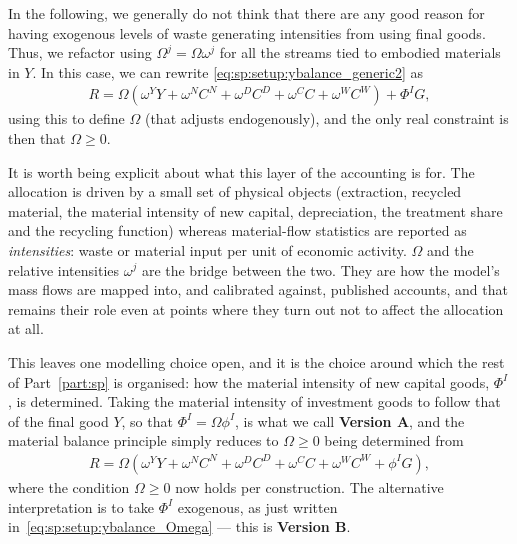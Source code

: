 In the following, we generally do not think that there are any good reason for having exogenous levels of waste generating intensities from using final goods. Thus, we refactor using $\Omega^j = \Omega \omega^j$ for all the streams tied to embodied materials in $Y$. In this case, we can rewrite \eqref{eq:sp:setup:ybalance_generic2} as
\begin{align}
    R =  \Omega \left(\omega^Y Y + \omega^{N}C^N + \omega^{D}C^D + \omega^C C + \omega^W C^W\right) + \Phi^I G \label{eq:sp:setup:ybalance_Omega},
\end{align}
using this to define $\Omega$ (that adjusts endogenously), and the only real constraint is then that $\Omega\geq0$.

It is worth being explicit about what this layer of the accounting is for. The allocation is driven by a small set of physical objects (extraction, recycled material, the material intensity of new capital, depreciation, the treatment share and the recycling function) whereas material-flow statistics are reported as \emph{intensities}: waste or material input per unit of economic activity. $\Omega$ and the relative intensities $\omega^j$ are the bridge between the two. They are how the model's mass flows are mapped into, and calibrated against, published accounts, and that remains their role even at points where they turn out not to affect the allocation at all.


This leaves one modelling choice open, and it is the choice around which the rest of Part~\ref{part:sp} is organised: how the material intensity of new capital goods, $\Phi^I$, is determined. Taking the material intensity of investment goods to follow that of the final good $Y$, so that $\Phi^I = \Omega \phi^I$, is what we call \textbf{Version A}, and the material balance principle simply reduces to $\Omega \geq0$ being determined from
\begin{align}
    R =  \Omega \left(\omega^Y Y + \omega^{N}C^N + \omega^{D}C^D + \omega^C C + \omega^W C^W+\phi^I G\right) \label{eq:sp:setup:ybalance_OmegaPhi},
\end{align}
where the condition $\Omega\geq0$ now holds per construction. The alternative interpretation is to take $\Phi^I$ exogenous, as just written in~\eqref{eq:sp:setup:ybalance_Omega} --- this is \textbf{Version B}.




